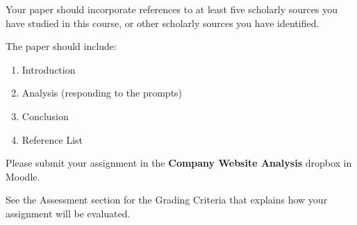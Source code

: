 \documentclass[
]{book}
\providecommand{\tightlist}{%
  \setlength{\itemsep}{0pt}\setlength{\parskip}{0pt}}
\begin{document}
\begin{assessment}
Your paper should incorporate references to at least five scholarly
sources you have studied in this course, or other scholarly sources you
have identified.

The paper should include:

\begin{enumerate}
\def\labelenumi{\arabic{enumi}.}
\tightlist
\item
  Introduction
\item
  Analysis (responding to the prompts)
\item
  Conclusion
\item
  Reference List
\end{enumerate}

Please submit your assignment in the \textbf{Company Website Analysis}
dropbox in Moodle.

See the Assessment section for the Grading Criteria that explains how
your assignment will be evaluated.
\end{assessment}
\end{document}
